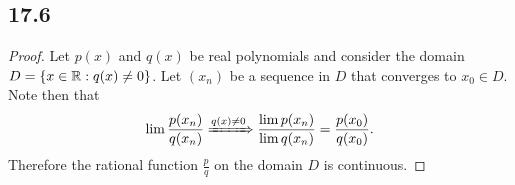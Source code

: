 \documentclass[12pt,titlepage]{extarticle}
\begin{document}
\subsection*{17.6}
\begin{proof}
    Let $p(x)$ and $q(x)$ be real polynomials and consider the domain $D = \qty{x \in \mathbb{R} : q(x) \neq 0}$. Let $(x_n)$ be a sequence in $D$ that converges to $x_0 \in D$. Note then that
    \[
        \lim \frac{p(x_n)}{q(x_n)} \xRightarrow{q(x) \neq 0} \frac{\lim p(x_n)}{\lim q(x_n)} = \frac{p(x_0)}{q(x_0)}
    .\]
    Therefore the rational function $\frac{p}{q}$ on the domain $D$ is continuous.
\end{proof}
\end{document}
